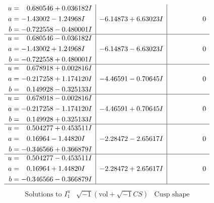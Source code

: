 \documentclass[1p]{elsarticle_modified}
\theoremstyle{definition}
\newcommand{\I}{\sqrt{-1}}
\begin{document}
$$\begin{array}{c|c|c}
\begin{aligned}
u &= \phantom{-}0.680546 + 0.036182 I \\
a &= -1.43002 - 1.24968 I \\
b &= -0.722558 - 0.480001 I\end{aligned}
 & -6.14873 + 6.63023 I & \phantom{-0.000000 } 0 \\ \hline\begin{aligned}
u &= \phantom{-}0.680546 - 0.036182 I \\
a &= -1.43002 + 1.24968 I \\
b &= -0.722558 + 0.480001 I\end{aligned}
 & -6.14873 - 6.63023 I & \phantom{-0.000000 } 0 \\ \hline\begin{aligned}
u &= \phantom{-}0.678918 + 0.002816 I \\
a &= -0.217258 + 1.174120 I \\
b &= \phantom{-}0.149928 - 0.325133 I\end{aligned}
 & -4.46591 - 0.70645 I & \phantom{-0.000000 } 0 \\ \hline\begin{aligned}
u &= \phantom{-}0.678918 - 0.002816 I \\
a &= -0.217258 - 1.174120 I \\
b &= \phantom{-}0.149928 + 0.325133 I\end{aligned}
 & -4.46591 + 0.70645 I & \phantom{-0.000000 } 0 \\ \hline\begin{aligned}
u &= \phantom{-}0.504277 + 0.453511 I \\
a &= \phantom{-}0.16964 - 1.44820 I \\
b &= -0.346566 + 0.366879 I\end{aligned}
 & -2.28472 - 2.65617 I & \phantom{-0.000000 } 0 \\ \hline\begin{aligned}
u &= \phantom{-}0.504277 - 0.453511 I \\
a &= \phantom{-}0.16964 + 1.44820 I \\
b &= -0.346566 - 0.366879 I\end{aligned}
 & -2.28472 + 2.65617 I & \phantom{-0.000000 } 0\\
 \hline 
 \end{array}$$\newpage$$\begin{array}{c|c|c}  
\text{Solutions to }I^u_{1}& \I (\text{vol} + \sqrt{-1}CS) & \text{Cusp shape}\\
 \hline 
\begin{aligned}

\end{aligned}
\end{array}$$
\end{document}
